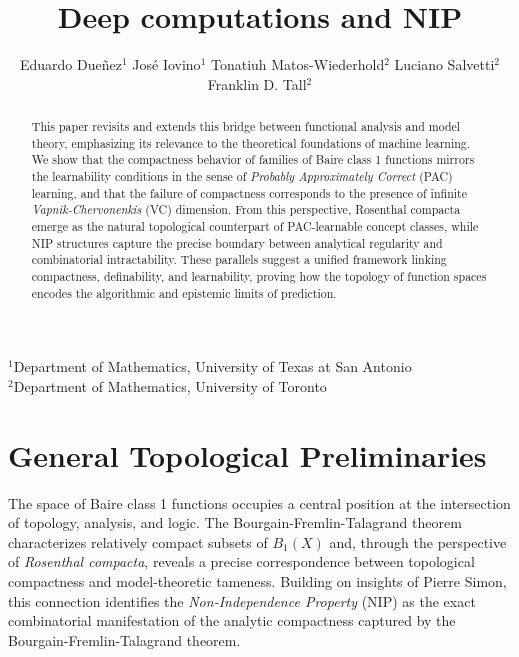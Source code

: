 \documentclass[psamsfonts]{amsart}
\title{Deep computations and NIP}
\author[Dueñez, Iovino, Matos-Wiederhold, Salvetti, Tall]{
Eduardo Dueñez$^{1}$ \qquad
José Iovino$^{1}$ \qquad
Tonatiuh Matos-Wiederhold$^{2}$ \qquad
Luciano Salvetti$^{2}$ \qquad
Franklin D. Tall$^{2}$
}
\theoremstyle{definition}
\theoremstyle{remark}
\numberwithin{equation}{section}
\begin{document}
\maketitle

{\centering\tiny\vspace{-0.6cm}
$^{1}$Department of Mathematics, University of Texas at San Antonio\\
$^{2}$Department of Mathematics, University of Toronto\\
}

\begin{abstract}
This paper revisits and extends this bridge between functional analysis and model theory, emphasizing its relevance to the theoretical foundations of machine learning. We show that the compactness behavior of families of Baire class 1 functions mirrors the learnability conditions in the sense of \emph{Probably Approximately Correct} (PAC) learning, and that the failure of compactness corresponds to the presence of infinite \emph{Vapnik-Chervonenkis} (VC) dimension. From this perspective, Rosenthal compacta emerge as the natural topological counterpart of PAC-learnable concept classes, while NIP structures capture the precise boundary between analytical regularity and combinatorial intractability. These parallels suggest a unified framework linking compactness, definability, and learnability, proving how the topology of function spaces encodes the algorithmic and epistemic limits of prediction.
\end{abstract}

\maketitle

\section{General Topological Preliminaries}

The space of Baire class 1 functions occupies a central position at the intersection of topology, analysis, and logic. The Bourgain-Fremlin-Talagrand theorem characterizes relatively compact subsets of $B_1(X)$ and, through the perspective of \emph{Rosenthal compacta}, reveals a precise correspondence between topological compactness and model-theoretic tameness. Building on insights of Pierre Simon, this connection identifies the \emph{Non-Independence Property} (NIP) as the exact combinatorial manifestation of the analytic compactness captured by the Bourgain-Fremlin-Talagrand theorem.
\end{document}
